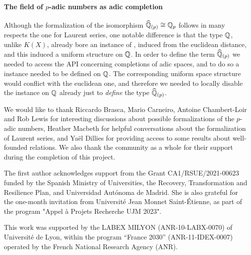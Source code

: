 \documentclass[sigplan,10pt, nonacm, review]{acmart}
\begin{document}
\paragraph{The field of $p$-adic numbers as adic completion}
Although the formalization of the isomorphism $\widehat{\mathbb{Q}}_{(p)}\cong\mathbb{Q}_p$ follows in many respects the one for Laurent series, one notable difference is that the type $\mathbb{Q}$, unlike $K(X)$, already bore an instance of , induced from the euclidean distance, and this induced a uniform structure on $\mathbb{Q}$. In order to define the term $\widehat{\mathbb{Q}}_{(p)}$ we needed to access the API concerning completions of adic spaces, and to do so a  instance needed to be defined on $\mathbb{Q}$. The corresponding uniform space structure would conflict with the euclidean one, and therefore we needed to locally disable the  instance on $\mathbb{Q}$ already just to \emph{define} the type $\widehat{\mathbb{Q}}_{(p)}$.


\begin{acks}
We would like to thank Riccardo Brasca, Mario Carneiro, Antoine Chambert-Loir and Rob Lewis for interesting discussions about possible formalizations of the $p$-adic numbers, Heather Macbeth for helpful conversations about the formalization of Laurent series, and Yaël Dillies for providing access to some results about well-founded relations. We also thank the \mathlib community as a whole for their support during the completion of this project.

The first author acknowledges support from the Grant CA1/RSUE/2021-00623 funded by the Spanish Ministry of Universities, the Recovery, Transformation and Resilience Plan, and Universidad Autónoma de Madrid. She is also grateful for the one-month invitation from Université Jean Monnet Saint-Étienne, as part of the
program "Appel à Projets Recherche UJM 2023".


This work was supported by the LABEX MILYON (ANR-10-LABX-0070) of Université de Lyon, within the program ``France 2030'' (ANR-11-IDEX-0007) operated by the French National Research Agency (ANR).
\end{acks}





\end{document}
